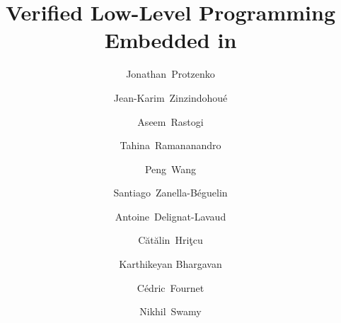 \documentclass[acmsmall,review,anonymous]{acmart}\settopmatter{printfolios=true}
\begin{document}

\setlength{\pdfpageheight}{\paperheight}
\setlength{\pdfpagewidth}{\paperwidth}




\title{Verified Low-Level Programming Embedded in \fstar
}

\ifanon
\author{}
\else
\author{Jonathan~Protzenko}
\author{Jean-Karim~Zinzindohoué}
\author{Aseem~Rastogi}
\author{Tahina~Ramananandro}
\author{Peng~Wang}
\author{Santiago~Zanella-Béguelin}
\author{Antoine~Delignat-Lavaud}
\author{C\u{a}t\u{a}lin~Hri\c{t}cu}
\author{Karthikeyan Bhargavan}
\author{Cédric~Fournet}
\author{Nikhil~Swamy}
\makeatletter
\renewcommand{\@shortauthors}{Protzenko \emph{et.al.}}
\makeatother
\fi
\end{document}
